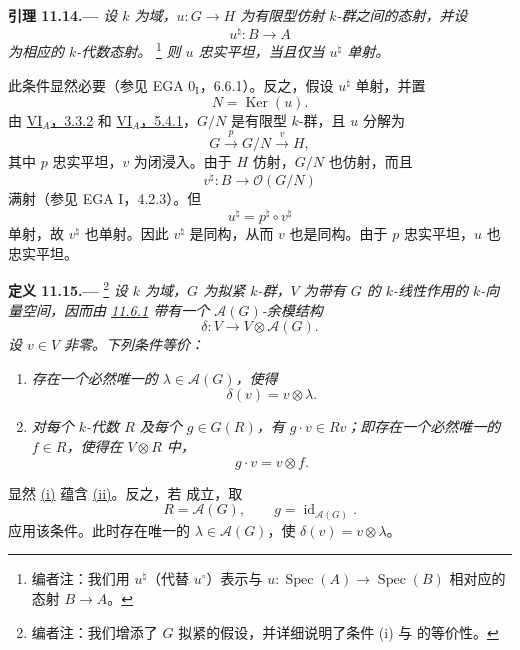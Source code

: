 \medskip
{}\label{lem:sga3-VIB-11.14}%
\noindent\textbf{引理 11.14.---}
\emph{设 \(k\) 为域，\(u:G\to H\) 为有限型仿射 \(k\)-群之间的态射，并设}
\[
  u^\natural:B\longrightarrow A
\]
\emph{为相应的 \(k\)-代数态射。}%
\footnote{\label{note:sga3-VIB-126}编者注：我们用 \(u^\natural\)\textup{（代替 \(u^\circ\)）}表示与 \(u:\operatorname{Spec}(A)\to\operatorname{Spec}(B)\) 相对应的态射 \(B\to A\)。}
\emph{则 \(u\) 忠实平坦，当且仅当 \(u^\natural\) 单射。}

此条件显然必要\textup{（参见 EGA 0\(_{\mathrm I}\)，6.6.1）}。反之，假设 \(u^\natural\) 单射，并置
\[
  N=\operatorname{Ker}(u).
\]
由 \hyperref[thm:sga3-VIA-3.3.2]{VI\(_A\)，3.3.2} 和 \hyperref[prop:sga3-VIA-5.4.1]{VI\(_A\)，5.4.1}，\(G/N\) 是有限型 \(k\)-群，且 \(u\) 分解为
\[
  G\xrightarrow{\ p\ }G/N\xrightarrow{\ v\ }H,
\]
其中 \(p\) 忠实平坦，\(v\) 为闭浸入。由于 \(H\) 仿射，\(G/N\) 也仿射，而且
\[
  v^\natural:B\longrightarrow\mathcal O(G/N)
\]
满射\textup{（参见 EGA I，4.2.3）}。但
\[
  u^\natural=p^\natural\circ v^\natural
\]
单射，故 \(v^\natural\) 也单射。因此 \(v^\natural\) 是同构，从而 \(v\) 也是同构。由于 \(p\) 忠实平坦，\(u\) 也忠实平坦。

\medskip
{}\label{def:sga3-VIB-11.15}%
\noindent\textbf{定义 11.15.---}%
\footnote{\label{note:sga3-VIB-127}编者注：我们增添了 \(G\) 拟紧的假设，并详细说明了条件 \textup{(i)} 与 \textup{} 的等价性。}
\emph{设 \(k\) 为域，\(G\) 为拟紧 \(k\)-群，\(V\) 为带有 \(G\) 的 \(k\)-线性作用的 \(k\)-向量空间，因而由 \hyperref[prop:sga3-VIB-11.6.1]{11.6.1} 带有一个 \(\mathcal A(G)\)-余模结构}
\[
  \delta:V\longrightarrow V\otimes\mathcal A(G).
\]
\emph{设 \(v\in V\) 非零。下列条件等价：}
\begin{enumerate}
\item[\textup{(i)}]\label{concl:sga3-VIB-11.15-i}
  \emph{存在一个必然唯一的 \(\lambda\in\mathcal A(G)\)，使得}
\[
    \delta(v)=v\otimes\lambda.
  \]
\item[\textup{(ii)}]\label{concl:sga3-VIB-11.15-ii}
  \emph{对每个 \(k\)-代数 \(R\) 及每个 \(g\in G(R)\)，有 \(g\cdot v\in Rv\)；即存在一个必然唯一的 \(f\in R\)，使得在 \(V\otimes R\) 中，}
\[
    g\cdot v=v\otimes f.
  \]
\end{enumerate}

显然 \hyperref[concl:sga3-VIB-11.15-i]{\textup{(i)}} 蕴含 \hyperref[concl:sga3-VIB-11.15-ii]{\textup{(ii)}}。反之，若 \textup{} 成立，取
\[
  R=\mathcal A(G),
  \qquad
  g=\operatorname{id}_{\mathcal A(G)}.
\]
应用该条件。此时存在唯一的 \(\lambda\in\mathcal A(G)\)，使 \(\delta(v)=v\otimes\lambda\)。

